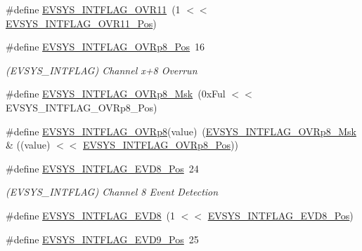 \begin{DoxyCompactItemize}
\#define \mbox{\hyperlink{group___s_a_m_d21___e_v_s_y_s_ga7e1e779b4ee1a51cf8e45319386086e8}{E\+V\+S\+Y\+S\+\_\+\+I\+N\+T\+F\+L\+A\+G\+\_\+\+O\+V\+R11}}~(1 $<$$<$ \mbox{\hyperlink{group___s_a_m_d21___e_v_s_y_s_ga872f16f082b3c4f57a5edd89fc5e9f65}{E\+V\+S\+Y\+S\+\_\+\+I\+N\+T\+F\+L\+A\+G\+\_\+\+O\+V\+R11\+\_\+\+Pos}})
\item 
\#define \mbox{\hyperlink{group___s_a_m_d21___e_v_s_y_s_gade0e8f8087c724961ba856f1e516bdb1}{E\+V\+S\+Y\+S\+\_\+\+I\+N\+T\+F\+L\+A\+G\+\_\+\+O\+V\+Rp8\+\_\+\+Pos}}~16
\begin{DoxyCompactList}\small\item\em (E\+V\+S\+Y\+S\+\_\+\+I\+N\+T\+F\+L\+AG) Channel x+8 Overrun \end{DoxyCompactList}\item 
\#define \mbox{\hyperlink{group___s_a_m_d21___e_v_s_y_s_ga6ffca4cae08806d9fe7d930dda19d20c}{E\+V\+S\+Y\+S\+\_\+\+I\+N\+T\+F\+L\+A\+G\+\_\+\+O\+V\+Rp8\+\_\+\+Msk}}~(0x\+Ful $<$$<$ E\+V\+S\+Y\+S\+\_\+\+I\+N\+T\+F\+L\+A\+G\+\_\+\+O\+V\+Rp8\+\_\+\+Pos)
\item 
\#define \mbox{\hyperlink{group___s_a_m_d21___e_v_s_y_s_ga2591add140a553a4c0623fce7e8bef85}{E\+V\+S\+Y\+S\+\_\+\+I\+N\+T\+F\+L\+A\+G\+\_\+\+O\+V\+Rp8}}(value)~(\mbox{\hyperlink{group___s_a_m_d21___e_v_s_y_s_ga6ffca4cae08806d9fe7d930dda19d20c}{E\+V\+S\+Y\+S\+\_\+\+I\+N\+T\+F\+L\+A\+G\+\_\+\+O\+V\+Rp8\+\_\+\+Msk}} \& ((value) $<$$<$ \mbox{\hyperlink{group___s_a_m_d21___e_v_s_y_s_gade0e8f8087c724961ba856f1e516bdb1}{E\+V\+S\+Y\+S\+\_\+\+I\+N\+T\+F\+L\+A\+G\+\_\+\+O\+V\+Rp8\+\_\+\+Pos}}))
\item 
\#define \mbox{\hyperlink{group___s_a_m_d21___e_v_s_y_s_ga5131a6151b285a9dcec2ef3a4b023543}{E\+V\+S\+Y\+S\+\_\+\+I\+N\+T\+F\+L\+A\+G\+\_\+\+E\+V\+D8\+\_\+\+Pos}}~24
\begin{DoxyCompactList}\small\item\em (E\+V\+S\+Y\+S\+\_\+\+I\+N\+T\+F\+L\+AG) Channel 8 Event Detection \end{DoxyCompactList}\item 
\#define \mbox{\hyperlink{group___s_a_m_d21___e_v_s_y_s_gaff5398a5e2438eea8784638d9589d2a2}{E\+V\+S\+Y\+S\+\_\+\+I\+N\+T\+F\+L\+A\+G\+\_\+\+E\+V\+D8}}~(1 $<$$<$ \mbox{\hyperlink{group___s_a_m_d21___e_v_s_y_s_ga5131a6151b285a9dcec2ef3a4b023543}{E\+V\+S\+Y\+S\+\_\+\+I\+N\+T\+F\+L\+A\+G\+\_\+\+E\+V\+D8\+\_\+\+Pos}})
\item 
\#define \mbox{\hyperlink{group___s_a_m_d21___e_v_s_y_s_ga839721268721622ec3547c5f0a8bb3e5}{E\+V\+S\+Y\+S\+\_\+\+I\+N\+T\+F\+L\+A\+G\+\_\+\+E\+V\+D9\+\_\+\+Pos}}~25

\end{DoxyCompactItemize}

